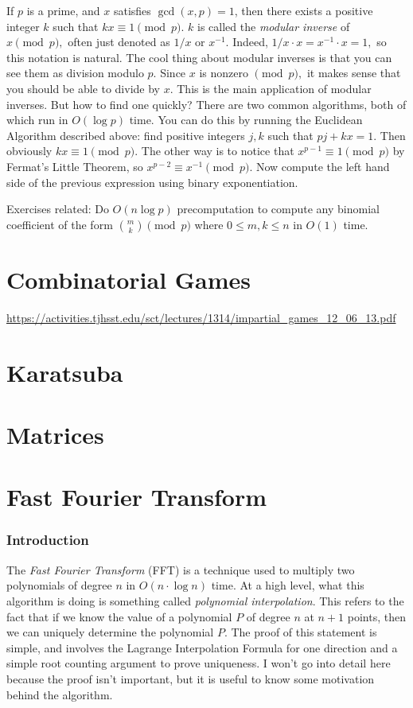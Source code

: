 If $p$ is a prime, and $x$ satisfies $\gcd(x, p) = 1$, then there exists a positive integer $k$ such that $kx \equiv 1 \pmod{p}.$ $k$ is called the \emph{modular inverse} of $x \pmod{p},$ often just denoted as $1/x$ or $x^{-1}.$ Indeed, $1/x \cdot x = x^{-1} \cdot x = 1,$ so this notation is natural. The cool thing about modular inverses is that you can see them as division modulo $p.$ Since $x$ is nonzero $\pmod{p},$ it makes sense that you should be able to divide by $x.$ This is the main application of modular inverses. But how to find one quickly? There are two common algorithms, both of which run in $O(\log p)$ time. You can do this by running the Euclidean Algorithm described above: find positive integers $j, k$ such that $pj + kx = 1.$ Then obviously $kx \equiv 1 \pmod{p}.$ The other way is to notice that $x^{p-1} \equiv 1 \pmod{p}$ by Fermat's Little Theorem, so $x^{p-2} \equiv x^{-1} \pmod{p}.$ Now compute the left hand side of the previous expression using binary exponentiation.

Exercises related: Do $O(n \log p)$ precomputation to compute any binomial coefficient of the form $\binom{m}{k} \pmod{p}$ where $0 \le m, k \le n$ in $O(1)$ time.

\section{Combinatorial Games}

\url{https://activities.tjhsst.edu/sct/lectures/1314/impartial_games_12_06_13.pdf}

\section{Karatsuba}

\section{Matrices}

\section{Fast Fourier Transform}

\subsubsection{Introduction}

The \emph{Fast Fourier Transform} (FFT) is a technique used to multiply two polynomials of degree $n$ in $O(n \cdot \log n)$ time. At a high level, what this algorithm is doing is something called \emph{polynomial interpolation}. This refers to the fact that if we know the value of a polynomial $P$ of degree $n$ at $n+1$ points, then we can uniquely determine the polynomial $P.$ The proof of this statement is simple, and involves the Lagrange Interpolation Formula for one direction and a simple root counting argument to prove uniqueness. I won't go into detail here because the proof isn't important, but it is useful to know some motivation behind the algorithm.


